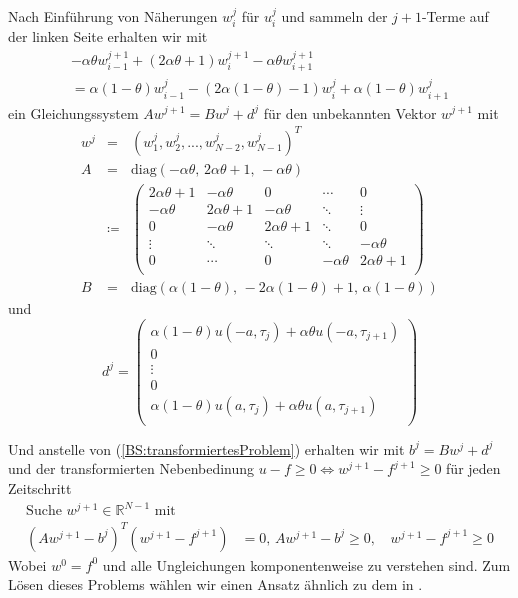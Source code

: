 Nach Einführung von Näherungen $w_i^j$ für $u_i^j$ und sammeln der $j+1$-Terme auf der linken Seite erhalten wir mit
\begin{multline}
-\alpha\theta w_{i-1}^{j+1} + \left(2\alpha\theta + 1 \right)w_i^{j+1} - \alpha\theta w_{i+1}^{j+1} \nonumber \\
= \alpha \left(1- \theta \right)w_{i-1}^j - \left(2 \alpha \left(1-\theta\right) - 1 \right) w_i^j + \alpha \left(1-\theta\right) w_{i+1}^j 
\end{multline}
ein Gleichungssystem $Aw^{j+1} = Bw^j + d^j$ für den unbekannten Vektor $w^{j+1}$ mit
\begin{eqnarray*}
w^j & = & \left(w_1^j,w_2^j, ... , w_{N-2}^j,w_{N-1}^j\right)^T \\
A &=& \text{diag}\left(-\alpha\theta,\, 2\alpha\theta + 1,\,-\alpha\theta\right) \\
  & \coloneqq & \begin{pmatrix}
 2\alpha\theta +1  & -\alpha\theta          &  0    & \cdots & 0      \\
 -\alpha\theta  & 2\alpha\theta +1 & -\alpha\theta      &   \ddots    & \vdots \\
 0         & -\alpha\theta   & 2\alpha\theta +1 & \ddots &    0    \\
 \vdots    & \ddots     & \ddots & \ddots & -\alpha\theta      \\
 0         & \cdots     & 0      & -\alpha\theta & 2\alpha\theta + 1 \\
 \end{pmatrix} \\
B &=& \text{diag}\left(\alpha\left(1-\theta\right),\,-2\alpha\left(1-\theta\right)+1,\,\alpha\left(1-\theta\right)\right)
\end{eqnarray*}
und
\begin{equation*}
d^j = \begin{pmatrix}
         \alpha\left(1-\theta\right)u(-a,\tau _j) + \alpha\theta u(-a,\tau _{j+1}) \\
         0 \\
         \vdots \\
         0 \\
         \alpha\left(1-\theta\right)u(a,\tau _j) + \alpha\theta u(a,\tau _{j+1}) \\
      \end{pmatrix}
\end{equation*}

Und anstelle von (\ref{BS:transformiertesProblem}) erhalten wir mit $b^j = Bw^j + d^j$ und der transformierten Nebenbedinung $u-f\geq 0 \Leftrightarrow w^{j+1} - f^{j+1} \geq 0$ für jeden Zeitschritt
\begin{eqnarray}
\text{Suche } w^{j+1} \in \mathbb{R}^{N-1} \text{ mit}  & & \nonumber \\
 \left(Aw^{j+1} - b^j\right)^T\left(w^{j+1} - f^{j+1}\right)& = 0 \text{, } Aw^{j+1} - b^j \geq 0 \text{, }&  w^{j+1} - f^{j+1} \geq 0 \label{BS:transformiertesProblemLGS}
\end{eqnarray}
Wobei $w^0 = f^0$ und alle Ungleichungen komponentenweise zu verstehen sind. Zum Lösen dieses Problems wählen wir einen Ansatz ähnlich zu dem in \cite{BrennanSchwartz}.

